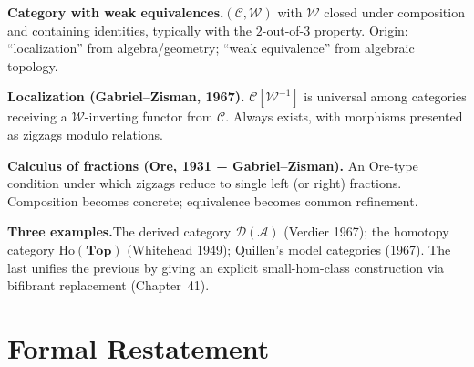 \begin{summarybox}
\textbf{Category with weak equivalences.}\quad $(\mathcal{C}, \mathcal{W})$
with $\mathcal{W}$ closed under composition and containing identities,
typically with the $2$-out-of-$3$ property. Origin: ``localization''
from algebra/geometry; ``weak equivalence'' from algebraic topology.

\textbf{Localization (Gabriel--Zisman, 1967).}\quad
$\mathcal{C}[\mathcal{W}^{-1}]$ is universal among categories receiving
a $\mathcal{W}$-inverting functor from $\mathcal{C}$. Always exists,
with morphisms presented as zigzags modulo relations.

\textbf{Calculus of fractions (Ore, 1931 + Gabriel--Zisman).}\quad
An Ore-type condition under which zigzags reduce to single left (or
right) fractions. Composition becomes concrete; equivalence becomes
common refinement.

\textbf{Three examples.}\quad The derived category $\mathcal{D}(\mathcal{A})$
(Verdier 1967); the homotopy category $\mathrm{Ho}(\mathbf{Top})$
(Whitehead 1949); Quillen's model categories (1967). The last unifies
the previous by giving an explicit small-hom-class construction via
bifibrant replacement (Chapter~41).
\end{summarybox}


\section*{Formal Restatement}

